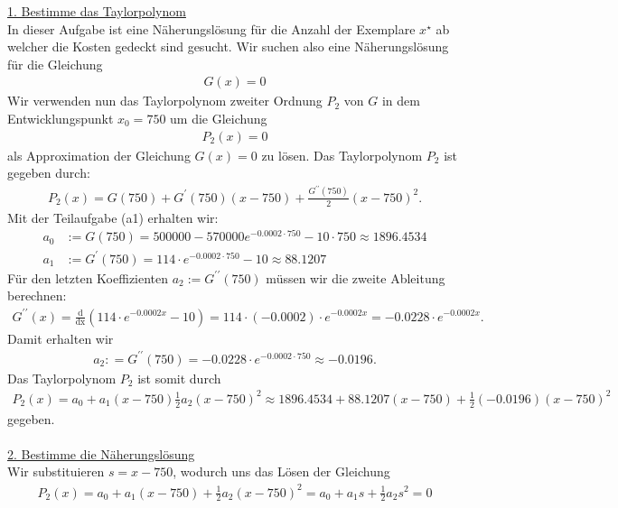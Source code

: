\underline{1. Bestimme das Taylorpolynom}\\
In dieser Aufgabe ist eine Näherungslösung für die Anzahl der Exemplare $x^\star$ ab welcher die Kosten gedeckt sind gesucht. Wir suchen also eine Näherungslösung für die Gleichung
\begin{align*}
	G(x) = 0
\end{align*}
Wir verwenden nun das Taylorpolynom zweiter Ordnung $P_2$ von $G$ in dem Entwicklungspunkt $x_0 = 750$ um die Gleichung
\begin{align*}
	P_2(x) = 0
\end{align*}
als Approximation der Gleichung $G(x) = 0$ zu lösen. Das Taylorpolynom $P_2$ ist gegeben durch:
\begin{align*}
	P_2(x)
	=
	G(750) 
	+ G^\prime(750) (x - 750)
	+ \frac{G^{\prime \prime}(750)}{2} (x - 750)^2.
\end{align*}
Mit der Teilaufgabe (a1)  erhalten wir:
\begin{align*}
	a_0 &:= G(750) 
	= 
	500000 - 570000 e^{-0.0002 \cdot 750 } - 10 \cdot 750
	\approx  1896.4534\\
	a_1 &:= G^\prime(750)
	=
	114 \cdot e^{-0.0002 \cdot  750}- 10
	\approx 88.1207
\end{align*}
Für den letzten Koeffizienten $a_2 := G^{\prime \prime}(750)$ müssen wir die zweite Ableitung berechnen:
\begin{align*}
	G^{\prime \prime}(x)
	=
	\frac{\mathrm{d}}{\mathrm{dx}}
	\left(
			114 \cdot e^{-0.0002 x}- 10
	\right)
	=
	114 \cdot  ( -0.0002) \cdot e^{-0.0002 x}
	=
	-0.0228 \cdot e^{-0.0002 x}.
\end{align*}
Damit erhalten wir
\begin{align*}
	a_2 : = G^{\prime \prime}(750)
	= -0.0228 \cdot e^{-0.0002 \cdot 750}
	\approx
	-0.0196.	
\end{align*}
Das Taylorpolynom $P_2$ ist somit durch 
\begin{align*}
	P_2(x)
	= 
	a_0 
	+ 
	a_1(x - 750)
	\frac{1}{2}
	a_2 
	(x - 750)^2 	
	\approx
	1896.4534
	+
	88.1207
	(x - 750)
	+
	\frac{1}{2}
	(-0.0196) (x - 750)^2
\end{align*}
gegeben.\\
\\
\underline{2. Bestimme die Näherungslösung}\\
Wir substituieren $s = x - 750$, wodurch uns das Lösen der Gleichung
\begin{align*}
	P_2(x) = a_0 
	+ 
	a_1(x - 750)
	+
	\frac{1}{2}
	a_2 
	(x - 750)^2 	
	=
	a_0 + a_1 s +\frac{1}{2} a_2 s^2 = 0
\end{align*}
